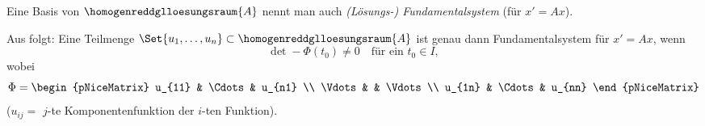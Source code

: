 \begin{definition}
  Eine Basis von \( \homogenreddglloesungsraum{A} \) nennt man auch \emph{(Lösungs-) Fundamentalsystem} (für \( x'=Ax \)).
\end{definition}
\begin{bemerkung*}
  Aus  folgt: Eine Teilmenge \( \Set{u_1,\dotsc,u_n}\subset \homogenreddglloesungsraum{A} \) ist genau dann Fundamentalsystem für \( x'=Ax \), wenn
  \begin{equation*}
    \det-{\Phi}(t_0)\neq 0\quad \text{für ein }t_0\in I,
  \end{equation*}
  wobei
  \begin{equation*}
    \Phi=\begin{pNiceMatrix} u_{11} & \Cdots & u_{n1} \\ \Vdots &  & \Vdots \\ u_{1n} & \Cdots & u_{nn} \end{pNiceMatrix}
  \end{equation*}
  (\( u_{ij}= \) \( j \)-te Komponentenfunktion der \( i \)-ten Funktion).
\end{bemerkung*}
